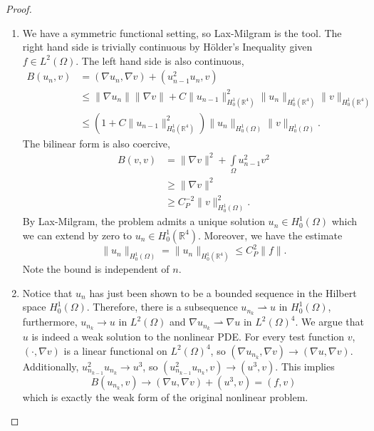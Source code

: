 \documentclass[letterpaper,twoside,11pt]{article}
\theoremstyle{mystyle}
\newcommand{\R}{{\mathbb R}}
\newcommand{\cbk}{\color{black}}
\begin{document}
\begin{proof}
\begin{enumerate}
    \item We have a symmetric functional setting, so Lax-Milgram is the tool. The right hand side is trivially continuous by H\"older's Inequality given $f \in L^2 (\Omega)$. The left hand side is also continuous, 
    \begin{align*}
      B(u_n,v) &= \left( \nabla u_n, \nabla v \right) + \left( u_{n-1}^2 u_n ,v \right)\\
      &\leq \|\nabla u_n\| \|\nabla v\| + C\|u_{n-1}\|^2_{H_0^1(\R^4)} \|u_n \|_{H_0^1(\R^4)} \|v\|_{H_0^1(\R^4)} \\
      &\leq \left( 1+C\|u_{n-1}\|^2_{H_0^1(\R^4)} \right)\|u_n \|_{H_0^1(\Omega)} \|v\|_{H_0^1(\Omega)}.
    \end{align*}
    The bilinear form is also coercive, 
    \begin{align*}
      B\left( v, v \right) &= \|\nabla v\|^2 + \int\limits_\Omega u_{n-1}^2 v^2 \\ 
      &\geq \|\nabla v\|^2 \\
      &\geq C_P^{-2} \|v\|_{H^1_0(\Omega)}^2.
    \end{align*}
    By Lax-Milgram, the problem admits a unique solution $u_n \in H_0^1 \left( \Omega \right)$ which we can extend by zero to $u_n \in H_0^1 \left( \R^4 \right)$. Moreover, we have the estimate 
    \[\|u_n\|_{H^1_0 \left( \Omega \right)} = \|u_n\|_{H^1_0 \left( \R^4 \right)} \leq C_P^2 \|f\|.\] Note the bound is independent of $n$. 
    \item Notice that $u_n$ has just been shown to be a bounded sequence in the Hilbert space $H_0^1 \left( \Omega \right)$. Therefore, there is a subsequence $u_{n_k} \rightharpoonup u$ in $H_0^1(\Omega)$, furthermore, $u_{n_k} \to u$ in $L^2 (\Omega)$ and $\nabla u_{n_k} \rightharpoonup \nabla u$ in $L^2 (\Omega)^{4}$. 
    We argue that $u$ is indeed a weak solution to the nonlinear PDE. For every test function $v$, $\left( \cdot, \nabla v \right)$ is a linear functional on $L^2(\Omega)^4$, so $\left( \nabla u_{n_k}, \nabla v \right) \to \left( \nabla u, \nabla v \right)$. Additionally, $u_{n_{k-1}}^2 u_{n_k} \to u^3$, so $\left( u_{n_{k-1}}^2 u_{n_k} ,v \right) \to \left( u^3, v \right)$. This implies 
    \[B(u_{n_k}, v) \to \left( \nabla u, \nabla v \right) + \left( u^3, v \right) = \left( f, v \right)\]
    which is exactly the weak form of the original nonlinear problem. 
  \end{enumerate}
\end{proof}
\cbk 
\end{document}
